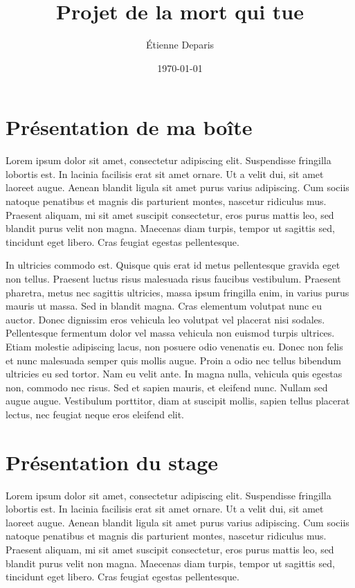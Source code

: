 \documentclass[a4paper,12pt]{report}
\title{Projet de la mort qui tue}
\author{Étienne Deparis}
\date{\today}
\begin{document}
\renewcommand{\labelitemi}{\large\textcolor{othergreen}{\fg}}
\groovypdtitre
\restoregeometry

\tableofcontents

\chapter{Présentation de ma boîte}
Lorem ipsum dolor sit amet, consectetur adipiscing elit. Suspendisse
fringilla lobortis est. In lacinia facilisis erat sit amet ornare. Ut
a velit dui, sit amet laoreet augue. Aenean blandit ligula sit amet
purus varius adipiscing. Cum sociis natoque penatibus et magnis dis
parturient montes, nascetur ridiculus mus. Praesent aliquam, mi sit
amet suscipit consectetur, eros purus mattis leo, sed blandit purus
velit non magna. Maecenas diam turpis, tempor ut sagittis sed,
tincidunt eget libero. Cras feugiat egestas pellentesque.

In ultricies commodo est. Quisque quis erat id metus pellentesque
gravida eget non tellus. Praesent luctus risus malesuada risus
faucibus vestibulum. Praesent pharetra, metus nec sagittis ultricies,
massa ipsum fringilla enim, in varius purus mauris ut massa. Sed in
blandit magna. Cras elementum volutpat nunc eu auctor. Donec dignissim
eros vehicula leo volutpat vel placerat nisi sodales. Pellentesque
fermentum dolor vel massa vehicula non euismod turpis ultrices. Etiam
molestie adipiscing lacus, non posuere odio venenatis eu. Donec non
felis et nunc malesuada semper quis mollis augue. Proin a odio nec
tellus bibendum ultricies eu sed tortor. Nam eu velit ante. In magna
nulla, vehicula quis egestas non, commodo nec risus. Sed et sapien
mauris, et eleifend nunc. Nullam sed augue augue. Vestibulum
porttitor, diam at suscipit mollis, sapien tellus placerat lectus, nec
feugiat neque eros eleifend elit.

\chapter{Présentation du stage}
Lorem ipsum dolor sit amet, consectetur adipiscing elit. Suspendisse
fringilla lobortis est. In lacinia facilisis erat sit amet ornare. Ut
a velit dui, sit amet laoreet augue. Aenean blandit ligula sit amet
purus varius adipiscing. Cum sociis natoque penatibus et magnis dis
parturient montes, nascetur ridiculus mus. Praesent aliquam, mi sit
amet suscipit consectetur, eros purus mattis leo, sed blandit purus
velit non magna. Maecenas diam turpis, tempor ut sagittis sed,
tincidunt eget libero. Cras feugiat egestas pellentesque.
\end{document}
